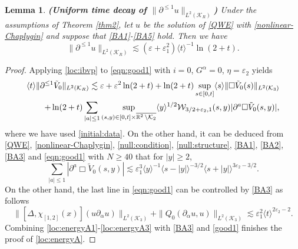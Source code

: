 \documentclass[11pt,twoside]{article}
\def\cK{\mathcal K}
\def\cW{\mathcal W}
\def\R{\mathop{\mathbb R\kern 0pt}\nolimits}
\def\p{\partial}
\def\ve{\varepsilon}
\def\ls{\lesssim}
\newcommand{\w}[1]{\langle {#1} \rangle}
\theoremstyle{plain}
\newtheorem{lemma}[theorem]{Lemma}
\theoremstyle{definition}
\numberwithin{equation}{section}
\begin{document}
\begin{lemma}
{\bf (Uniform time decay of $\|\p^{\le1}u\|_{L^2(\cK_R)}$)}
Under the assumptions of Theorem \ref{thm2}, let $u$ be the solution of \eqref{QWE}  with \eqref{nonlinear-Chaplygin}
and suppose that \eqref{BA1}-\eqref{BA5} hold.
Then we have
\begin{equation}\label{loc:energyA}
\|\p^{\le1}u\|_{L^2(\cK_R)}\ls(\ve+\ve_1^2)\w{t}^{-1}\ln(2+t).
\end{equation}
\end{lemma}
\begin{proof}
Applying \eqref{loc:ibvp} to \eqref{eqn:good1} with $i=0$, $G^\alpha=0$, $\eta=\ve_2$ yields
\begin{equation}\label{loc:energyA1}
\begin{split}
\w{t}\|\p^{\le1}\tilde V_0\|_{L^2(\cK_R)}\ls\ve+\ve^2\ln(2+t)+\ln(2+t)\sup_{s\in[0,t]}\w{s}\|\Box\tilde V_0(s)\|_{L^2(\cK_3)}\\
+\ln(2+t)\sum_{|a|\le1}\sup_{(s,y)\in[0,t]\times\overline{\R^2\setminus\cK_2}}\w{y}^{1/2}\cW_{3/2+\ve_2,1}(s,y)|\p^a\Box\tilde V_0(s,y)|,
\end{split}
\end{equation}
where we have used \eqref{initial:data}.
On the other hand, it can be deduced from \eqref{QWE}, \eqref{nonlinear-Chaplygin}, \eqref{null:condition}, \eqref{null:structure}, \eqref{BA1}, \eqref{BA2}, \eqref{BA3} and \eqref{eqn:good1} with $N\ge40$ that for $|y|\ge2$,
\begin{equation}\label{loc:energyA2}
\sum_{|a|\le1}|\p^a\Box\tilde V_0(s,y)|\ls\ve_1^3\w{y}^{-1}\w{s-|y|}^{-3/2}\w{s+|y|}^{3\ve_2-3/2}.
\end{equation}
On the other hand, the last line in \eqref{eqn:good1} can be controlled by \eqref{BA3} as follows
\begin{equation}\label{loc:energyA3}
\|[\Delta,\chi_{[1,2]}(x)](u\p_{\alpha}u)\|_{L^2(\cK_3)}+\|Q_0(\p_{\alpha}u,u)\|_{L^2(\cK_3)}
\ls\ve_1^2\w{t}^{2\ve_2-2}.
\end{equation}
Combining \eqref{loc:energyA1}-\eqref{loc:energyA3} with \eqref{BA3} and \eqref{good1} finishes the proof of \eqref{loc:energyA}.
\end{proof}
\end{document}

